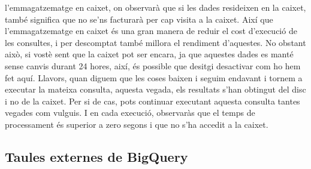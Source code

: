 \documentclass[12pt,longbibliography]{article}
\theoremstyle{definition}
\theoremstyle{remark}
\begin{document}
l'emmagatzematge en caixet, on observarà que si les dades resideixen en la caixet, també significa que no se'ns facturarà per cap visita a la caixet. Així que l'emmagatzematge en caixet és una gran manera de reduir el cost d'execució de les consultes, i per descomptat també millora el rendiment d'aquestes. No obstant això, si vostè sent que la caixet pot ser encara, ja que aquestes dades es manté sense canvis durant 24 hores, així, és possible que desitgi desactivar com ho hem fet aquí. Llavors, quan diguem que les coses baixen i seguim endavant i tornem a executar la mateixa consulta, aquesta vegada, els resultats s'han obtingut del disc i no de la caixet. Per si de cas, pots continuar executant aquesta consulta tantes vegades com vulguis. I en cada execució, observaràs que el temps de processament és superior a zero segons i que no s'ha accedit a la caixet.

\subsection{Taules externes de BigQuery}
\end{document}
